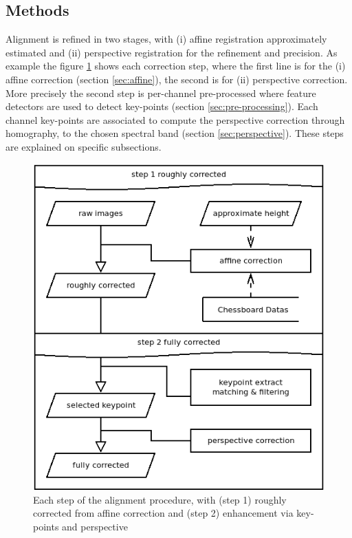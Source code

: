 \documentclass[a4paper,twoside]{article}
\begin{document}
	\subsection{Methods}
	
	Alignment is refined in two stages, with (i) affine registration approximately estimated and (ii) perspective registration for the refinement and precision.
	As example the figure \ref{fig:each-stages} shows each correction step, where the first line is for the
	(i) affine correction (section \ref{sec:affine}), the second is for (ii) perspective correction.
	More precisely the second step is per-channel pre-processed where feature detectors are used to detect key-points (section \ref{sec:pre-processing}).
	Each channel key-points are associated to compute the perspective correction through homography, to the chosen spectral band (section \ref{sec:perspective}).
	These steps are explained on specific subsections.
	
	\begin{figure}[h]
		\centering
		\includegraphics[width=0.8\linewidth]{../figures/step.png}
		\caption{Each step of the alignment procedure, with (step 1) roughly corrected from affine correction and (step 2) enhancement via key-points and perspective}
		\label{fig:each-stages}
	\end{figure}

	
\end{document}
